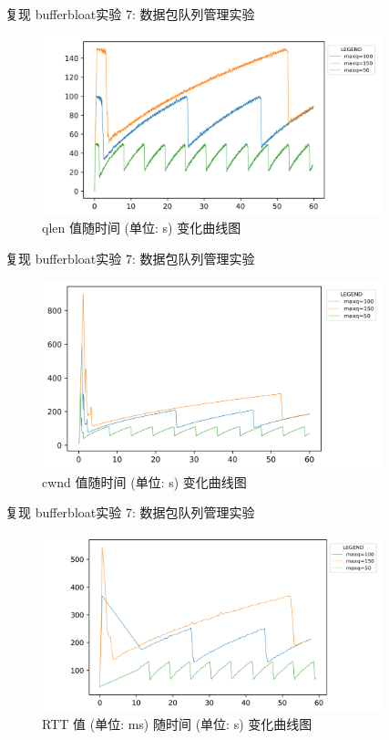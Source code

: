 \documentclass{beamer}
\begin{document}
\begin{frame}{复现 bufferbloat}{实验 7: 数据包队列管理实验}
    \begin{figure}[h]
        \centering %
        \includegraphics[width=280pt]{
            ../lab-07-pktq/readme.assets/rp-qlen.png}
        \caption{qlen 值随时间 (单位: s) 变化曲线图} %
    \end{figure}
\end{frame}
\begin{frame}{复现 bufferbloat}{实验 7: 数据包队列管理实验}
    \begin{figure}[h]
        \centering %
        \includegraphics[width=280pt]{
            ../lab-07-pktq/readme.assets/rp-cwnd.png}
        \caption{cwnd 值随时间 (单位: s) 变化曲线图} %
    \end{figure}
\end{frame}
\begin{frame}{复现 bufferbloat}{实验 7: 数据包队列管理实验}
    \begin{figure}[h]
        \centering %
        \includegraphics[width=280pt]{
            ../lab-07-pktq/readme.assets/rp-rtt.png}
        \caption{RTT 值 (单位: ms) 随时间 (单位: s) 变化曲线图} %
    \end{figure}
\end{frame}
\end{document}
